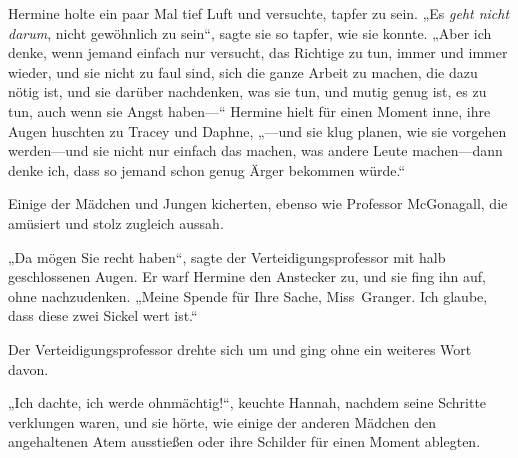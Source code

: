 Hermine holte ein paar Mal tief Luft und versuchte, tapfer zu sein. „Es \emph{geht nicht darum}, nicht gewöhnlich zu sein“, sagte sie so tapfer, wie sie konnte. „Aber ich denke, wenn jemand einfach nur versucht, das Richtige zu tun, immer und immer wieder, und sie nicht zu faul sind, sich die ganze Arbeit zu machen, die dazu nötig ist, und sie darüber nachdenken, was sie tun, und mutig genug ist, es zu tun, auch wenn sie Angst haben—“ Hermine hielt für einen Moment inne, ihre Augen huschten zu Tracey und Daphne, „—und sie klug planen, wie sie vorgehen werden—und sie nicht nur einfach das machen, was andere Leute machen—dann denke ich, dass so jemand schon genug Ärger bekommen würde.“

Einige der Mädchen und Jungen kicherten, ebenso wie Professor McGonagall, die amüsiert und stolz zugleich aussah.

„Da mögen Sie recht haben“, sagte der Verteidigungsprofessor mit halb geschlossenen Augen. Er warf Hermine den Anstecker zu, und sie fing ihn auf, ohne nachzudenken. „Meine Spende für Ihre Sache, Miss~Granger. Ich glaube, dass diese zwei Sickel wert ist.“

Der Verteidigungsprofessor drehte sich um und ging ohne ein weiteres Wort davon.

„Ich dachte, ich werde ohnmächtig!“, keuchte Hannah, nachdem seine Schritte verklungen waren, und sie hörte, wie einige der anderen Mädchen den angehaltenen Atem ausstießen oder ihre Schilder für einen Moment ablegten.

